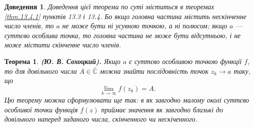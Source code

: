 \documentclass[12pt,fleqn]{article}
\theoremstyle{theorem}
\newtheorem{thm}{Теорема}[section]
\theoremstyle{proof}
\newtheorem*{dov}{Доведення}
\numberwithin{figure}{section}
\numberwithin{equation}{section}
\begin{document}
\begin{dov}
Доведення цієї теореми по суті міститься в теоремах \ref{thm.13.4.1} пунктів 13.3 і 13.4. Бо якщо головна частина містить нескінченне число членів, то $a$ не може бути ні усувною точкою, а ні полюсом; якщо $a$ --- суттєво особлива точка, то головна частина не може бути відсутньою, і не може містити скінченне число членів.
\end{dov}

\begin{thm}\label{thm.13.5.2}
  \textbf{(Ю. В. Сохоцкий).} Якщо $a$ є суттєво особливою точкою функції $f$, то для довільного числа $A\in \bar{\mathbb{C}}$ можна знайти послідовність точок $z_k \to a$ таку, що
  $$\lim_{k\to\infty}f(z_k)=A.$$
  Цю теорему можна сформулювати ще так: в як завгодно малому околі суттєво особливої точки функція $f(z)$ приймає значення як завгодно близькі до довільного наперед заданого числа, скінченного чи нескіченного.
\end{thm}
\end{document}
